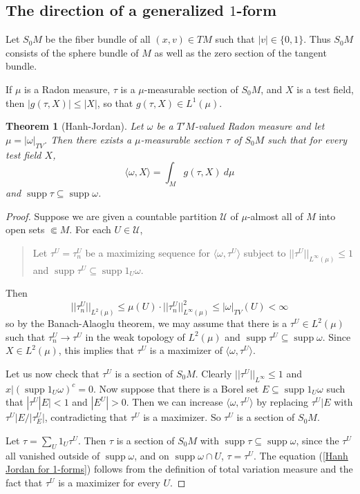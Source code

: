 \documentclass[reqno,12pt,letterpaper]{amsart}
\DeclareMathOperator{\supp}{supp}
\newtheorem{theorem}{Theorem}[section]
\theoremstyle{definition}
\numberwithin{equation}{section}
\begin{document}
\subsection{The direction of a generalized $1$-form}
Let $S_0M$ be the fiber bundle of all $(x, v) \in TM$ such that $|v| \in \{0, 1\}$.
Thus $S_0M$ consists of the sphere bundle of $M$ as well as the zero section of the tangent bundle.

If $\mu$ is a Radon measure, $\tau$ is a $\mu$-measurable section of $S_0M$, and $X$ is a test field, then $|g(\tau, X)| \leq |X|$, so that $g(\tau, X) \in L^1(\mu)$.

\begin{theorem}[Hanh-Jordan]
Let $\omega$ be a $T'M$-valued Radon measure and let $\mu = |\omega|_{TV}$. Then there exists a $\mu$-measurable section $\tau$ of $S_0M$ such that for every test field $X$,
\begin{equation}
\label{Hanh Jordan for 1-forms}
\langle \omega, X\rangle = \int_M g(\tau, X) ~d\mu
\end{equation}
and $\supp \tau \subseteq \supp \omega$.
\end{theorem}
\begin{proof}
Suppose we are given a countable partition $\mathcal U$ of $\mu$-almost all of $M$ into open sets $\Subset M$.
For each $U \in \mathcal U$,
\begin{quote}
Let $\tau^U = \tau^U_n$ be a maximizing sequence for $\langle \omega, \tau^U\rangle$ subject to $||\tau^U||_{L^\infty(\mu)} \leq 1$ and $\supp \tau^U \subseteq \supp 1_U\omega$.
\end{quote}
Then
$$||\tau^U_n||_{L^2(\mu)} \leq \mu(U) \cdot ||\tau^U_n||_{L^\infty(\mu)}^2 \leq |\omega|_{TV}(U) < \infty$$
so by the Banach-Alaoglu theorem, we may assume that there is a $\tau^U \in L^2(\mu)$ such that $\tau^U_n \to \tau^U$ in the weak topology of $L^2(\mu)$ and $\supp \tau^U \subseteq \supp \omega$.
Since $X \in L^2(\mu)$, this implies that $\tau^U$ is a maximizer of $\langle \omega, \tau^U\rangle$.

Let us now check that $\tau^U$ is a section of $S_0M$.
Clearly $||\tau^U||_{L^\infty} \leq 1$ and $x|(\supp 1_U\omega)^c = 0$.
Now suppose that there is a Borel set $E \subseteq \supp 1_U\omega$ such that $|\tau^U|E| < 1$ and $|E^U| > 0$.
Then we can increase $\langle \omega, \tau^U\rangle$ by replacing $\tau^U|E$ with $\tau^U|E/|\tau^U_E|$, contradicting that $\tau^U$ is a maximizer.
So $\tau^U$ is a section of $S_0M$.

Let $\tau = \sum_U 1_U \tau^U$.
Then $\tau$ is a section of $S_0M$ with $\supp \tau \subseteq \supp \omega$, since the $\tau^U$ all vanished outside of $\supp \omega$, and on $\supp \omega \cap U$, $\tau = \tau^U$.
The equation (\ref{Hanh Jordan for 1-forms}) follows from the definition of total variation measure and the fact that $\tau^U$ is a maximizer for every $U$.
\end{proof}
\end{document}
